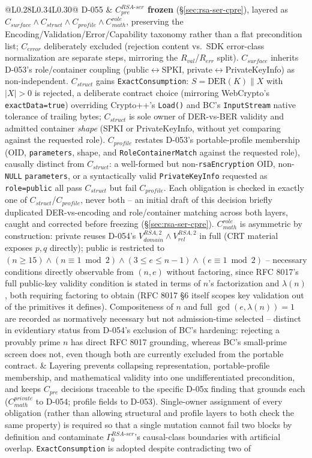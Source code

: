 \documentclass[11pt,a4paper]{article}
\begin{document}
\begin{longtable}{@{}L{0.28\textwidth}L{0.34\textwidth}L{0.30\textwidth}@{}}
D-055 & \textbf{$C_{pre}^{RSA\text{-}ser}$ frozen} (\S\ref{sec:rsa-ser-cpre}), layered as $C_{surface}\wedge C_{struct}\wedge C_{profile}\wedge C_{math}^{role}$, preserving the Encoding/Validation/Error/Capability taxonomy rather than a flat precondition list; $C_{error}$ deliberately excluded (rejection content vs.\ SDK error-class normalization are separate steps, mirroring the $R_{val}$/$R_{err}$ split). $C_{surface}$ inherits D-053's role/container coupling (public$\leftrightarrow$SPKI, private$\leftrightarrow$PrivateKeyInfo) as non-independent. $C_{struct}$ gains \texttt{ExactConsumption}: $S=\text{DER}(K)\|X$ with $|X|>0$ is rejected, a deliberate contract choice (mirroring WebCrypto's \texttt{exactData=true}) overriding Crypto++'s \texttt{Load()} and BC's \texttt{InputStream} native tolerance of trailing bytes; $C_{struct}$ is sole owner of DER-vs-BER validity and admitted container \emph{shape} (SPKI or PrivateKeyInfo, without yet comparing against the requested role). $C_{profile}$ restates D-053's portable-profile membership (OID, \texttt{parameters}, shape, and \texttt{RoleContainerMatch} against the requested role), causally distinct from $C_{struct}$: a well-formed but non-\texttt{rsaEncryption} OID, non-\texttt{NULL} \texttt{parameters}, or a syntactically valid \texttt{PrivateKeyInfo} requested as \texttt{role=public} all pass $C_{struct}$ but fail $C_{profile}$. Each obligation is checked in exactly one of $C_{struct}$/$C_{profile}$, never both -- an initial draft of this decision briefly duplicated DER-vs-encoding and role/container matching across both layers, caught and corrected before freezing (\S\ref{sec:rsa-ser-cpre}). $C_{math}^{role}$ is asymmetric by construction: private reuses D-054's $V_{domain}^{RSA,2}\wedge V_{rel}^{RSA,2}$ in full (CRT material exposes $p,q$ directly); public is restricted to $(n\ge15)\wedge(n\equiv1\bmod2)\wedge(3\le e\le n-1)\wedge(e\equiv1\bmod2)$ -- necessary conditions directly observable from $(n,e)$ without factoring, since RFC 8017's full public-key validity condition is stated in terms of $n$'s factorization and $\lambda(n)$, both requiring factoring to obtain (RFC 8017 \S6 itself scopes key validation out of the primitives it defines). Compositeness of $n$ and full $\gcd(e,\lambda(n))=1$ are recorded as normatively necessary but not admission-time selected -- distinct in evidentiary status from D-054's exclusion of BC's hardening: rejecting a provably prime $n$ has direct RFC 8017 grounding, whereas BC's small-prime screen does not, even though both are currently excluded from the portable contract. & Layering prevents collapsing representation, portable-profile membership, and mathematical validity into one undifferentiated precondition, and keeps $C_{pre}$ decisions traceable to the specific D-05x finding that grounds each ($C_{math}^{private}$ to D-054; profile fields to D-053). Single-owner assignment of every obligation (rather than allowing structural and profile layers to both check the same property) is required so that a single mutation cannot fail two blocks by definition and contaminate $\Gamma_0^{RSA\text{-}ser}$'s causal-class boundaries with artificial overlap. \texttt{ExactConsumption} is adopted despite contradicting two of 
\end{longtable}
\end{document}
